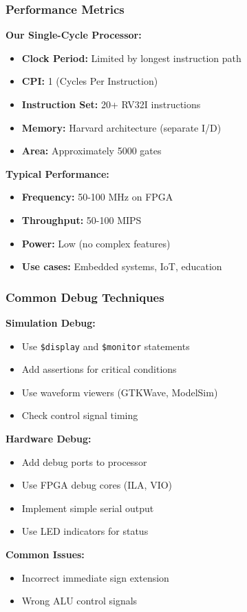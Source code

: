 \documentclass[aspectratio=169,xcolor=dvipsnames]{beamer}
\begin{document}
\begin{frame}
\frametitle{Performance Metrics}
\textbf{Our Single-Cycle Processor:}
\begin{itemize}
    \item \textbf{Clock Period:} Limited by longest instruction path
    \item \textbf{CPI:} 1 (Cycles Per Instruction)
    \item \textbf{Instruction Set:} 20+ RV32I instructions
    \item \textbf{Memory:} Harvard architecture (separate I/D)
    \item \textbf{Area:} Approximately 5000 gates
\end{itemize}

\vspace{1em}
\textbf{Typical Performance:}
\begin{itemize}
    \item \textbf{Frequency:} 50-100 MHz on FPGA
    \item \textbf{Throughput:} 50-100 MIPS
    \item \textbf{Power:} Low (no complex features)
    \item \textbf{Use cases:} Embedded systems, IoT, education
\end{itemize}
\end{frame}

\begin{frame}
\frametitle{Common Debug Techniques}
\textbf{Simulation Debug:}
\begin{itemize}
    \item Use \texttt{\$display} and \texttt{\$monitor} statements
    \item Add assertions for critical conditions
    \item Use waveform viewers (GTKWave, ModelSim)
    \item Check control signal timing
\end{itemize}

\vspace{1em}
\textbf{Hardware Debug:}
\begin{itemize}
    \item Add debug ports to processor
    \item Use FPGA debug cores (ILA, VIO)
    \item Implement simple serial output
    \item Use LED indicators for status
\end{itemize}

\vspace{1em}
\textbf{Common Issues:}
\begin{itemize}
    \item Incorrect immediate sign extension
    \item Wrong ALU control signals
\end{itemize}
\end{frame}
\end{document}
